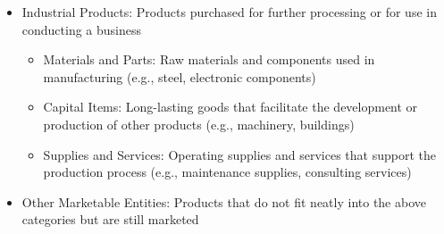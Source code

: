 \documentclass[openany,12pt,a4paper]{book}
\begin{document}
\begin{itemize}
\begin{itemize}
\begin{itemize}
        \end{itemize}
        \item Industrial Products: Products purchased for further processing or for use in conducting a business
        \begin{itemize}
            \item Materials and Parts: Raw materials and components used in manufacturing (e.g., steel, electronic components)
            \item Capital Items: Long-lasting goods that facilitate the development or production of other products (e.g., machinery, buildings)
            \item Supplies and Services: Operating supplies and services that support the production process (e.g., maintenance supplies, consulting services)
        \end{itemize}
        \item Other Marketable Entities: Products that do not fit neatly into the above categories but are still marketed
    \end{itemize}
\end{itemize}
\end{document}
